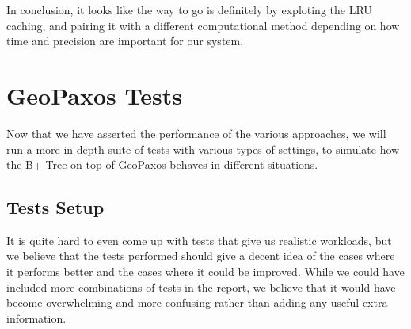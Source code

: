 In conclusion, it looks like the way to go is definitely by exploting the LRU caching, and pairing it with a different computational method depending on how time and precision are important for our system.


\section{GeoPaxos Tests}\label{sec:geopaxos-tests}
Now that we have asserted the performance of the various approaches, we will run a more in-depth suite of tests with various types of settings, to simulate how the B+ Tree on top of GeoPaxos behaves in different situations.
\subsection{Tests Setup}\label{sec:tests-setup}
It is quite hard to even come up with tests that give us realistic workloads, but we believe that the tests performed should give a decent idea of the cases where it performs better and the cases where it could be improved. While we could have included more combinations of tests in the report, we believe that it would have become overwhelming and more confusing rather than adding any useful extra information.

